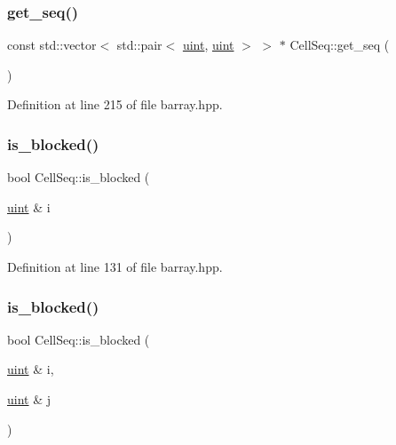\subsubsection{\texorpdfstring{get\+\_\+seq()}{get\_seq()}}
{\footnotesize\ttfamily const std\+::vector$<$ std\+::pair$<$ \hyperlink{namespacebarray_af9756a31953db233f80a9cfe1ef31c32}{uint}, \hyperlink{namespacebarray_af9756a31953db233f80a9cfe1ef31c32}{uint} $>$ $>$ $\ast$ Cell\+Seq\+::get\+\_\+seq (\begin{DoxyParamCaption}{ }\end{DoxyParamCaption})\hspace{0.3cm}{\ttfamily [inline]}}



Definition at line 215 of file barray.\+hpp.

\mbox{\label{classbarray_1_1_cell_seq_a994900efdcf73e7619f728d584e92c5a}} 
\subsubsection{\texorpdfstring{is\+\_\+blocked()}{is\_blocked()}\hspace{0.1cm}{\footnotesize\ttfamily [1/2]}}
{\footnotesize\ttfamily bool Cell\+Seq\+::is\+\_\+blocked (\begin{DoxyParamCaption}\item[{\hyperlink{namespacebarray_af9756a31953db233f80a9cfe1ef31c32}{uint} \&}]{i }\end{DoxyParamCaption})\hspace{0.3cm}{\ttfamily [inline]}}



Definition at line 131 of file barray.\+hpp.

\mbox{\label{classbarray_1_1_cell_seq_a5a5730ec094c9a4251753302a9504149}} 
\subsubsection{\texorpdfstring{is\+\_\+blocked()}{is\_blocked()}\hspace{0.1cm}{\footnotesize\ttfamily [2/2]}}
{\footnotesize\ttfamily bool Cell\+Seq\+::is\+\_\+blocked (\begin{DoxyParamCaption}\item[{\hyperlink{namespacebarray_af9756a31953db233f80a9cfe1ef31c32}{uint} \&}]{i,  }\item[{\hyperlink{namespacebarray_af9756a31953db233f80a9cfe1ef31c32}{uint} \&}]{j }\end{DoxyParamCaption})\hspace{0.3cm}{\ttfamily [inline]}}



